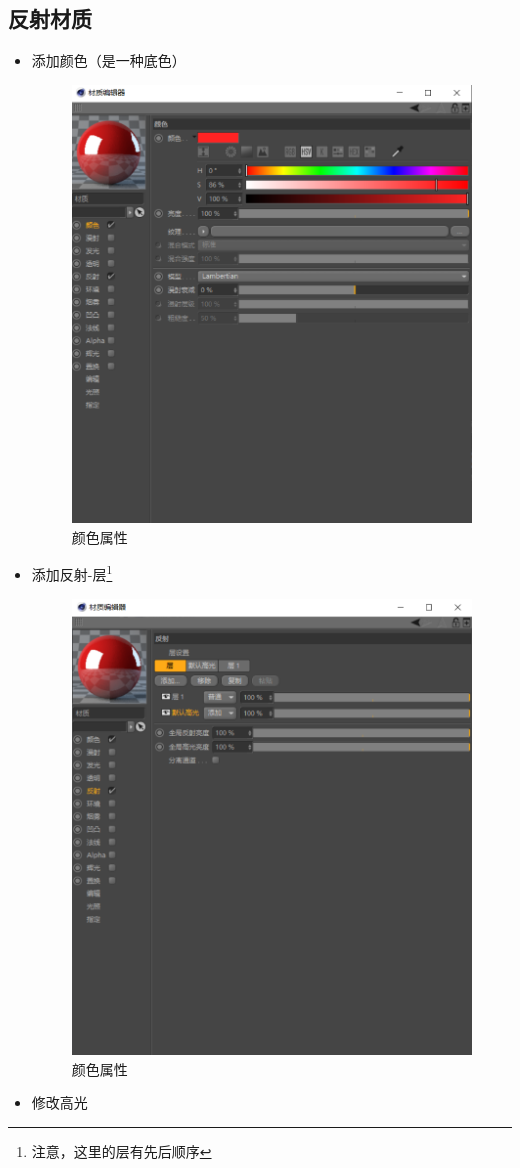 \documentclass[UTF8,oneside]{ctexbook}
\begin{document}
\subsection{反射材质}
\begin{itemize}
    \item 添加颜色（是一种底色）
    \begin{figure}[H]
        \centering
        \includegraphics[width=0.5\linewidth]{Fig//ref_01.png}
        \vspace{-0.3cm}
        \caption{颜色属性}\label{fig:ref_01}
    \end{figure}
    \item 添加反射-层\footnote{注意，这里的层有先后顺序}
    \begin{figure}[H]
        \centering
        \includegraphics[width=0.5\linewidth]{Fig//ref_02.png}
        \vspace{-0.3cm}
        \caption{颜色属性}\label{fig:ref_02}
    \end{figure}
    \item 修改高光
    \begin{figure}[H]
        \centering

\end{figure}
\end{itemize}
\end{document}
